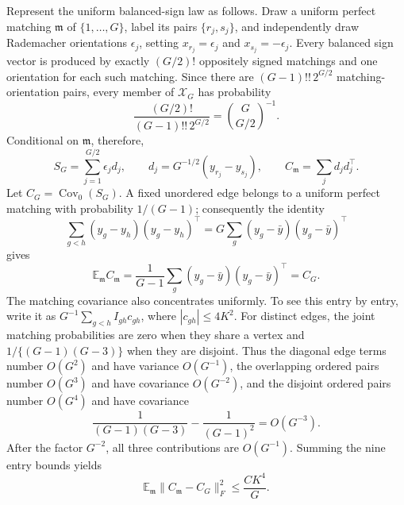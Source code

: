 Represent the uniform balanced-sign law as follows.  Draw a uniform perfect matching \(\mathfrak m\) of \(\{1,\ldots,G\}\), label its pairs \(\{r_j,s_j\}\), and independently draw Rademacher orientations \(\epsilon_j\), setting \(x_{r_j}=\epsilon_j\) and \(x_{s_j}=-\epsilon_j\).  Every balanced sign vector is produced by exactly \((G/2)!\) oppositely signed matchings and one orientation for each such matching.  Since there are \((G-1)!!\,2^{G/2}\) matching-orientation pairs, every member of \(\mathcal X_G\) has probability
\[
 \frac{(G/2)!}{(G-1)!!\,2^{G/2}}
 =\binom{G}{G/2}^{-1}.
\]
Conditional on \(\mathfrak m\), therefore,
\[
 S_G=\sum_{j=1}^{G/2}\epsilon_jd_j,
 \qquad d_j=G^{-1/2}(y_{r_j}-y_{s_j}),
 \qquad C_{\mathfrak m}=\sum_jd_jd_j^\top.                  \tag{23}
\]
Let \(C_G=\operatorname{Cov}_0(S_G)\).  A fixed unordered edge belongs to a uniform perfect matching with probability \(1/(G-1)\); consequently the identity
\[
 \sum_{g<h}(y_g-y_h)(y_g-y_h)^\top
 =G\sum_g(y_g-\bar y)(y_g-\bar y)^\top
\]
gives
\[
 \mathbb E_{\mathfrak m}C_{\mathfrak m}
 =\frac1{G-1}\sum_g(y_g-\bar y)(y_g-\bar y)^\top=C_G.      \tag{24}
\]
The matching covariance also concentrates uniformly.  To see this entry by entry, write it as \(G^{-1}\sum_{g<h}I_{gh}c_{gh}\), where \(|c_{gh}|\leq4K^2\).  For distinct edges, the joint matching probabilities are zero when they share a vertex and \(1/\{(G-1)(G-3)\}\) when they are disjoint.  Thus the diagonal edge terms number \(O(G^2)\) and have variance \(O(G^{-1})\), the overlapping ordered pairs number \(O(G^3)\) and have covariance \(O(G^{-2})\), and the disjoint ordered pairs number \(O(G^4)\) and have covariance
\[
 \frac1{(G-1)(G-3)}-\frac1{(G-1)^2}=O(G^{-3}).
\]
After the factor \(G^{-2}\), all three contributions are \(O(G^{-1})\).  Summing the nine entry bounds yields
\[
 \mathbb E_{\mathfrak m}\|C_{\mathfrak m}-C_G\|_F^2
 \leq \frac{C K^4}{G}.                                    \tag{25}
\]

